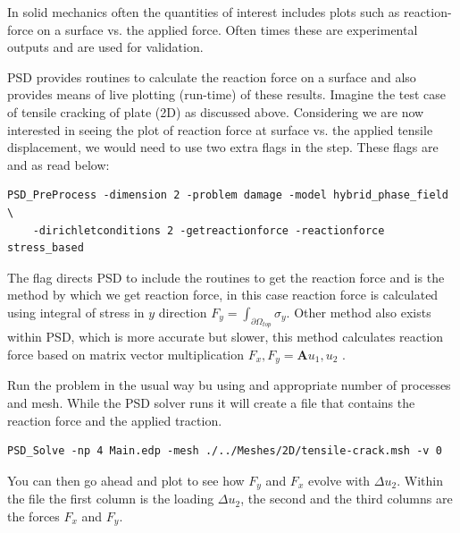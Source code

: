 {{In solid mechanics often the quantities of interest includes plots such as reaction-force on a surface vs. the applied force. Often times these are experimental outputs and are used for validation. 

PSD provides routines to calculate the reaction force on a surface and also provides means of live plotting (run-time)  of these results. Imagine the test case of tensile cracking of plate (2D) as discussed above. Considering we are now interested in seeing the plot of reaction force at surface vs. the applied tensile displacement, we would need to use two extra flags in the    step. These flags are  and  as read below:

\begin{lstlisting}[style=BashInputStyle]
	PSD_PreProcess -dimension 2 -problem damage -model hybrid_phase_field \
	-dirichletconditions 2 -getreactionforce -reactionforce stress_based
\end{lstlisting}

The flag   directs PSD to include the routines to get the reaction force and   is the method by which we get reaction force, in this case reaction force is calculated using integral of stress in $y$ direction $F_y=\int_{\partial\Omega_{top}} \sigma_y$. Other method  also exists within PSD, which is more accurate but slower, this method calculates reaction force based on matrix vector multiplication ${F_x,F_y}=\mathbf{A}{u_1,u_2}$ .

Run the problem in the usual way bu using  and appropriate number of processes and mesh.  While the PSD solver runs it will create a file  that contains the reaction force and the applied traction. 

\begin{lstlisting}[style=BashInputStyle]
	PSD_Solve -np 4 Main.edp -mesh ./../Meshes/2D/tensile-crack.msh -v 0
\end{lstlisting}

You can then go ahead and plot  to see how $F_y$ and $F_x$  evolve  with $\Delta u_2$. Within the file the first column is the loading $\Delta u_2$, the second and the third columns are the forces $F_x$ and $F_y$.



\begin{figure}[h!]
	\centering
	

\end{figure}}}
